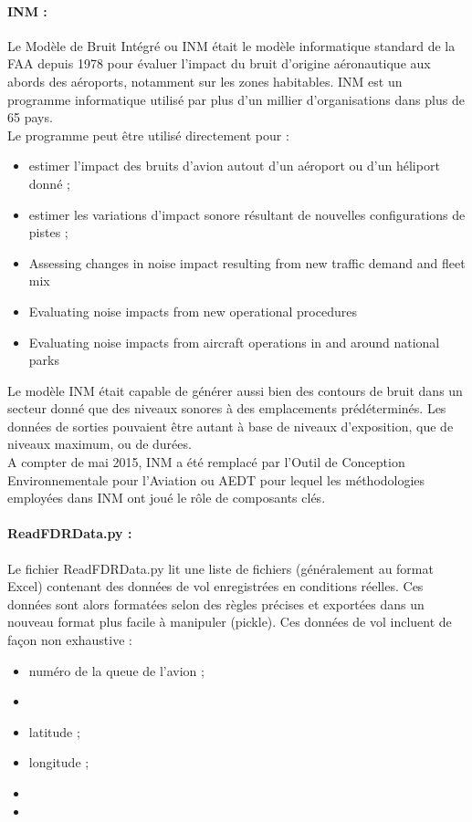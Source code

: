 \documentclass[a4paper]{article}
\begin{document}
    \paragraph{INM :}
    Le Modèle de Bruit Intégré ou \gls{INM} était le modèle  informatique standard de la FAA depuis 1978 pour évaluer l'impact du bruit d'origine aéronautique aux abords des aéroports, notamment sur les zones habitables. \gls{INM} est un programme informatique utilisé par plus d'un millier d'organisations dans plus de 65 pays.\\
    Le programme peut être utilisé directement pour :
    \begin{itemize}
        \item estimer l'impact des bruits d'avion autout d'un aéroport ou d'un héliport donné ;
        \item estimer les variations d'impact sonore résultant de nouvelles configurations de pistes ;
        \item Assessing changes in noise impact resulting from new traffic demand and fleet mix
        \item Evaluating noise impacts from new operational procedures
        \item Evaluating noise impacts from aircraft operations in and around national parks
    \end{itemize}
    Le modèle \gls{INM} était capable de générer aussi bien des contours de bruit dans un secteur donné que des niveaux sonores à des emplacements prédéterminés. Les données de sorties pouvaient être autant à base de niveaux d'exposition, que de niveaux maximum, ou de durées.\\
    A compter de mai 2015, \gls{INM} a été remplacé par l'Outil de Conception Environnementale pour l'Aviation ou \gls{AEDT} pour lequel les méthodologies employées dans INM ont joué le rôle de composants clés.
    \paragraph{ReadFDRData.py :}
    Le fichier ReadFDRData.py lit une liste de fichiers (généralement au format Excel) contenant des données de vol enregistrées en conditions réelles. Ces données sont alors formatées selon des règles précises et exportées dans un nouveau format plus facile à manipuler (pickle). Ces données de vol incluent de façon non exhaustive :
    \begin{itemize}
        \renewcommand{\labelitemi}{$\bullet$}
        \item numéro de la queue de l'avion ;
        \item 
        \item latitude ;
        \item longitude ;
        \item 
        \item 
    \end{itemize}
\end{document}
